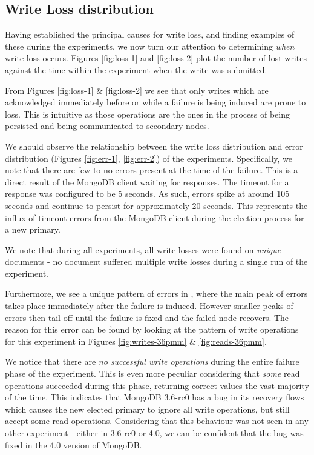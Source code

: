 \subsection{Write Loss distribution}
Having established the principal causes for write loss, and finding examples of these during the experiments, we now turn our attention to determining \textit{when} write loss occurs. Figures \ref{fig:loss-1} and \ref{fig:loss-2} plot the number of lost writes against the time within the experiment when the write was submitted.

From Figures \ref{fig:loss-1} \& \ref{fig:loss-2} we see that only writes which are acknowledged immediately before or while a failure is being induced are prone to loss. This is intuitive as those operations are the ones in the process of being persisted and being communicated to secondary nodes. 


We should observe the relationship between the write loss distribution and error distribution (Figures \ref{fig:err-1}, \ref{fig:err-2}) of the experiments. Specifically, we note that there are few to no errors present at the time of the failure. This is a direct result of the MongoDB client waiting for responses. The timeout for a response was configured to be 5 seconds. As such, errors spike at around 105 seconds and continue to persist for approximately 20 seconds. This represents the influx of timeout errors from the MongoDB client during the election process for a new primary.

We note that during all experiments, all write losses were found on \textit{unique} documents - no document suffered multiple write losses during a single run of the experiment.

Furthermore, we see a unique pattern of errors in , where the main peak of errors takes place immediately after the failure is induced. However smaller peaks of errors then tail-off until the failure is fixed and the failed node recovers. The reason for this error can be found by looking at the pattern of write operations for this experiment in Figures \ref{fig:writes-36pmm} \& \ref{fig:reads-36pmm}. 

We notice that there are \textit{no successful write operations} during the entire failure phase of the experiment. This is even more peculiar considering that \textit{some} read operations succeeded during this phase, returning correct values the vast majority of the time. This indicates that MongoDB 3.6-rc0 has a bug in its recovery flows which causes the new elected primary to ignore all write operations, but still accept some read operations. Considering that this behaviour was not seen in any other experiment - either in 3.6-rc0 or 4.0, we can be confident that the bug was fixed in the 4.0 version of MongoDB.

